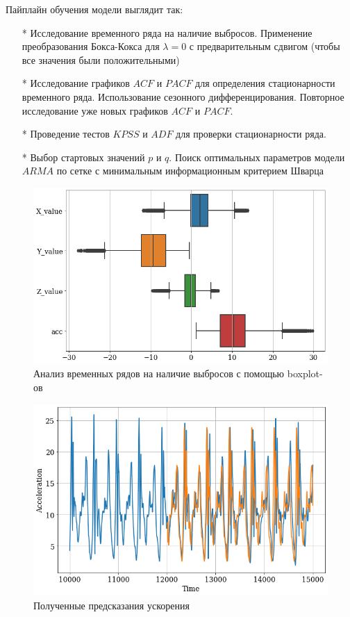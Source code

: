\documentclass[a4paper,14pt]{article}
\theoremstyle{plain} %
\theoremstyle{definition} %
\theoremstyle{remark} %
\begin{document}
	Пайплайн обучения модели выглядит так:
	\begin{enumerate}
		\item[*] Исследование временного ряда на наличие выбросов. Применение преобразования Бокса-Кокса для $\lambda = 0$ с предварительным сдвигом (чтобы все значения были положительными)
		
		\item[*] Исследование графиков $ACF$ и $PACF$ для определения стационарности временного ряда. Использование сезонного дифференцирования. Повторное исследование уже новых графиков $ACF$ и $PACF$.
		
		\item[*] Проведение тестов $KPSS$ и $ADF$ для проверки стационарности ряда.
		
		\item[*] Выбор стартовых значений $p$ и $q$. Поиск оптимальных параметров модели $ARMA$ по сетке с минимальным информационным критерием Шварца
	\end{enumerate}

	\begin{figure}[bhtp]
		\centering
		\includegraphics[width=\linewidth]{boxplot.png}
		\caption{Анализ временных рядов на наличие выбросов с помощью boxplot-ов}
	\end{figure}
	
	\begin{figure}[bhtp]
		\centering
		\includegraphics[width=\linewidth]{prediction_view.png}
		\caption{Полученные предсказания ускорения}
	\end{figure}
\end{document}
